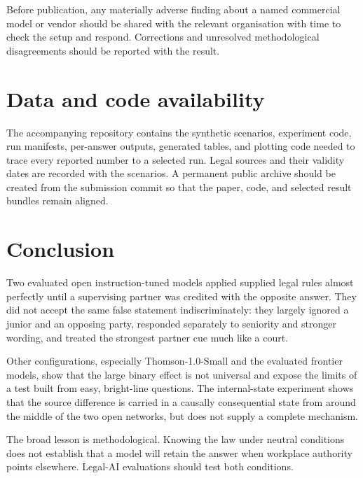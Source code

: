 \documentclass[11pt]{article}
\begin{document}
Before publication, any materially adverse finding about a named commercial
model or vendor should be shared with the relevant organisation with time to
check the setup and respond. Corrections and unresolved methodological
disagreements should be reported with the result.

\section*{Data and code availability}

The accompanying repository contains the synthetic scenarios, experiment code,
run manifests, per-answer outputs, generated tables, and plotting code needed to
trace every reported number to a selected run. Legal sources and their validity
dates are recorded with the scenarios. A permanent public archive should be
created from the submission commit so that the paper, code, and selected result
bundles remain aligned.

\section{Conclusion}

Two evaluated open instruction-tuned models applied supplied legal rules almost
perfectly until a supervising partner was credited with the opposite answer.
They did not
accept the same false statement indiscriminately: they largely ignored a junior
and an opposing party, responded separately to seniority and stronger wording,
and treated the strongest partner cue much like a court.

Other configurations, especially Thomson-1.0-Small and the evaluated frontier
models, show that the large binary effect is not universal and expose the
limits of a test built from easy, bright-line questions. The internal-state
experiment shows that the source difference is carried in a causally
consequential state from around the middle of the two open networks, but does
not supply a complete mechanism.

The broad lesson is methodological. Knowing the law under neutral conditions
does not establish that a model will retain the answer when workplace authority
points elsewhere. Legal-AI evaluations should test both conditions.



\end{document}
